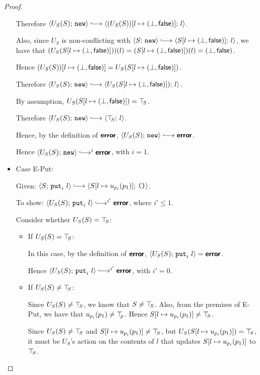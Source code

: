 \begin{proof}
\begin{itemize}
    Therefore $\config{U_S(S)}{\NEW} \parstepsto
    \config{\extS{(U_S(S))}{l}{\bot}{\frozenfalse}}{l}$.

    Also, since $U_S$ is non-conflicting with $\config{S}{\NEW}
    \parstepsto \config{\extS{S}{l}{\bot}{\frozenfalse}}{l}$, we
    have that $(U_S(S[l \mapsto (\bot, \textsf{false})]))(l) =
    (S[l \mapsto (\bot, \textsf{false})])(l) =
    (\bot, \textsf{false})$.

    Hence $(U_S(S))[l \mapsto (\bot, \textsf{false})] =
    U_S(S[l \mapsto (\bot, \textsf{false})])$.

    Therefore $\config{U_S(S)}{\NEW} \parstepsto
    \config{U_S(\extS{S}{l}{\bot}{\frozenfalse})}{l}$.

    By assumption, $U_S(S[l \mapsto (\bot, \textsf{false})]) = \top\hspace{-0.85mm}_{S}$.

    Therefore $\config{U_S(S)}{\NEW} \parstepsto \config{\topS}{l}$.

    Hence, by the definition of $\textbf{\textsf{error}}$, $\config{U_S(S)}{\NEW}
    \parstepsto \error$.

    Hence $\config{U_S(S)}{\NEW} \parstepsto^i \error$, with $i = 1$.

  \item Case {\sc E-Put}:

    Given: $\config{S}{\putiexp{l}} \parstepsto
    \config{\extSRaw{S}{l}{u_{p_i}(p_1)}}{\unit}$.

    To show: $\config{U_S(S)}{\putiexp{l}} \parstepsto^{i'} \error$,
    where $i' \leq 1$.

    Consider whether $U_S(S) = \top\hspace{-0.85mm}_{S}$:
    \begin{itemize}

      \item If $U_S(S) = \top\hspace{-0.85mm}_{S}$:

        In this case, by the definition of $\textbf{\textsf{error}}$,
        $\langle U_S(S);\, \mbox{\texttt{put}}_i~l \rangle = \textbf{\textsf{error}}$.

        Hence $\config{U_S(S)}{\putiexp{l}}
        \parstepsto^{i'} \error$, with $i' = 0$.

      \item If $U_S(S) \neq \top\hspace{-0.85mm}_{S}$:

        Since $U_S(S) \neq \top\hspace{-0.85mm}_{S}$, we know that $S \neq \top\hspace{-0.85mm}_{S}$.  Also,
        from the premises of {\sc E-Put}, we have that $u_{p_i}(p_1)
        \neq \top\hspace{-0.85mm}_{p}$.  Hence $S[l \mapsto u_{p_i}(p_1)] \neq \top\hspace{-0.85mm}_{S}$.

        Since $U_S(S) \neq \top\hspace{-0.85mm}_{S}$ and $S[l \mapsto u_{p_i}(p_1)]
        \neq \top\hspace{-0.85mm}_{S}$, but $U_S(S[l \mapsto u_{p_i}(p_1)]) = \top\hspace{-0.85mm}_{S}$,
        it must be $U_S$'s action on the contents of $l$ that updates
        $S[l \mapsto u_{p_i}(p_1)]$ to $\top\hspace{-0.85mm}_{S}$.


\end{itemize}
\end{itemize}
\end{proof}
